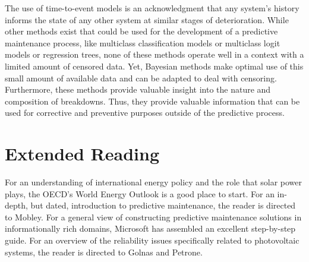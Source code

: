 The use of time-to-event models is an acknowledgment that any system's history informs the state of any other system at similar stages of deterioration. While other methods exist that could be used for the development of a predictive maintenance process, like multiclass classification models or multiclass logit models or regression trees, none of these methods operate well in a context with a limited amount of censored data. Yet, Bayesian methods make optimal use of this small amount of available data and can be adapted to deal with censoring. Furthermore, these methods provide valuable insight into the nature and composition of breakdowns. Thus, they provide valuable information that can be used for corrective and preventive purposes outside of the predictive process.


\section*{Extended Reading}

For an understanding of international energy policy and the role that solar power plays, the OECD's World Energy Outlook is a good place to start\cite{EIAOutlook2016}. For an in-depth, but dated, introduction to predictive maintenance, the reader is directed to Mobley\cite{Mobley2002}. For a general view of constructing predictive maintenance solutions in informationally rich domains, Microsoft has assembled an excellent step-by-step guide\cite{Uz2016}. For an overview of the reliability issues specifically related to photovoltaic systems, the reader is directed to Golnas\cite{Golnas2013} and Petrone\cite{Petrone2008}. 


